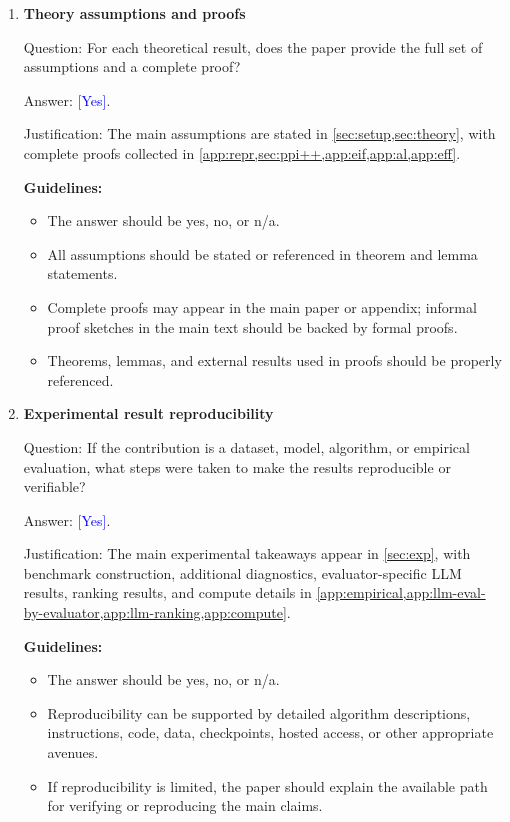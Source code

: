 \documentclass{article}
\theoremstyle{plain}
\theoremstyle{definition}
\newcommand{\1}{\mathbf{1}}
\providecommand{\answerYes}[1][]{\textcolor{blue}{[Yes]#1}}
\begin{document}
\begin{enumerate}[leftmargin=5mm]
\item \textbf{Theory assumptions and proofs}

Question: For each theoretical result, does the paper provide the full set of
assumptions and a complete proof?

Answer: \answerYes{}.

Justification: The main assumptions are stated in \cref{sec:setup,sec:theory},
with complete proofs collected in
\cref{app:repr,sec:ppi++,app:eif,app:al,app:eff}.

\textbf{Guidelines:}
\begin{itemize}[leftmargin=5mm, noitemsep]
\item The answer should be yes, no, or n/a.
\item All assumptions should be stated or referenced in theorem and lemma
statements.
\item Complete proofs may appear in the main paper or appendix; informal proof
sketches in the main text should be backed by formal proofs.
\item Theorems, lemmas, and external results used in proofs should be properly
referenced.
\end{itemize}

\item \textbf{Experimental result reproducibility}

Question: If the contribution is a dataset, model, algorithm, or empirical
evaluation, what steps were taken to make the results reproducible or
verifiable?

Answer: \answerYes{}.

Justification: The main experimental takeaways appear in \cref{sec:exp}, with
benchmark construction, additional diagnostics, evaluator-specific LLM results,
ranking results, and compute details in
\cref{app:empirical,app:llm-eval-by-evaluator,app:llm-ranking,app:compute}.

\textbf{Guidelines:}
\begin{itemize}[leftmargin=5mm, noitemsep]
\item The answer should be yes, no, or n/a.
\item Reproducibility can be supported by detailed algorithm descriptions,
instructions, code, data, checkpoints, hosted access, or other appropriate
avenues.
\item If reproducibility is limited, the paper should explain the available
path for verifying or reproducing the main claims.
\end{itemize}


\end{enumerate}
\end{document}
